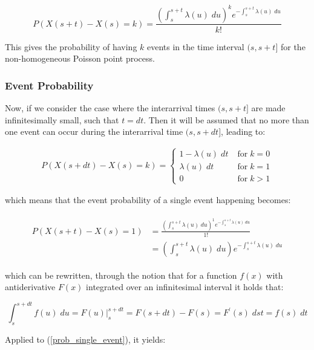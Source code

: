 \begin{equation}
    P(X(s+t) - X(s) = k) = \frac{\left(\int_s^{s+t} \lambda(u) \; du \right)^k e^{-\int_s^{s+t} \lambda(u) \; du}}{k!}
\end{equation}

This gives the probability of having $k$ events in the time interval $(s, s+t]$ for the non-homogeneous Poisson point process.


\subsubsection{Event Probability}
\label{sec:Method:Possion:EventProbability}

Now, if we consider the case where the interarrival times $(s, s+t]$ are made infinitesimally small, such that $t = dt$. 
Then it will be assumed that no more than one event can occur during the interarrival time $(s, s+dt]$, leading to:

\begin{align}
P(X(s+dt) - X(s) = k) = 
\begin{cases}
    1 - \lambda(u) \; dt \; &\text{for} \; k=0 \\
    \lambda(u) \; dt \; &\text{for} \; k=1 \\
    0 \; &\text{for} \; k > 1
\end{cases}
\end{align}

which means that the event probability of a single event happening becomes:

\begin{align}
\begin{split}
    P(X(s+t) - X(s) = 1) &= \frac{\left(\int_s^{s+t} \lambda(u) \; du \right)^1 e^{-\int_s^{s+t} \lambda(u) \; du}}{1!} \\
    &= \left(\int_s^{s+t} \lambda(u) \; du \right) e^{-\int_s^{s+t} \lambda(u) \; du}
\label{prob_single_event}
\end{split}
\end{align}


which can be rewritten, through the notion that for a function $f(x)$ with antiderivative $F(x)$ integrated over an infinitesimal interval it holds that:

\begin{equation}
    \int_s^{s+dt} f(u) \; du = F(u) \rvert_s^{s+dt} = F(s+dt) - F(s) = F^{\prime}(s) \; dst = f(s) \; dt
\end{equation}

Applied to (\ref{prob_single_event}), it yields:

